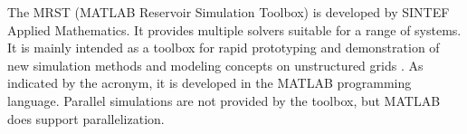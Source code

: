 The MRST (MATLAB Reservoir Simulation Toolbox) is developed by SINTEF Applied Mathematics. It provides multiple solvers suitable for a range of systems. It is mainly intended as a toolbox for rapid prototyping and demonstration of new simulation methods and modeling concepts on unstructured grids \cite{Sintef2014Sintef}. As indicated by the acronym, it is developed in the MATLAB programming language. Parallel simulations are not provided by the toolbox, but MATLAB does support parallelization.


